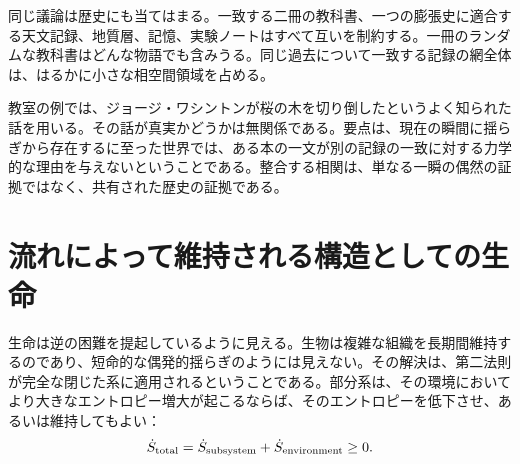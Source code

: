 同じ議論は歴史にも当てはまる。一致する二冊の教科書、一つの膨張史に適合する天文記録、地質層、記憶、実験ノートはすべて互いを制約する。一冊のランダムな教科書はどんな物語でも含みうる。同じ過去について一致する記録の網全体は、はるかに小さな相空間領域を占める。

教室の例では、ジョージ・ワシントンが桜の木を切り倒したというよく知られた話を用いる。その話が真実かどうかは無関係である。要点は、現在の瞬間に揺らぎから存在するに至った世界では、ある本の一文が別の記録の一致に対する力学的な理由を与えないということである。整合する相関は、単なる一瞬の偶然の証拠ではなく、共有された歴史の証拠である。

\begin{classroomqa}
\end{classroomqa}

\begin{classroomqa}
\end{classroomqa}

\section{流れによって維持される構造としての生命}

生命は逆の困難を提起しているように見える。生物は複雑な組織を長期間維持するのであり、短命的な偶発的揺らぎのようには見えない。その解決は、第二法則が完全な閉じた系に適用されるということである。部分系は、その環境においてより大きなエントロピー増大が起こるならば、そのエントロピーを低下させ、あるいは維持してもよい：
\begin{equation}
 \dot S_{\rm total}
 =\dot S_{\rm subsystem}+\dot S_{\rm environment}\geq 0.
 \label{eq:sm8-open-system-second-law}
\end{equation}

